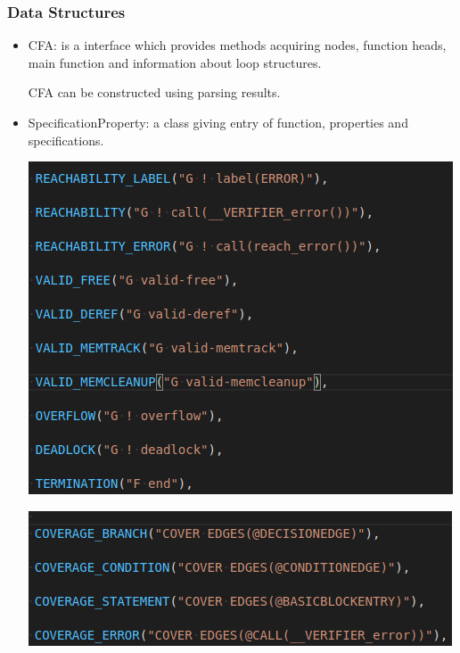 \documentclass[11pt]{beamer}
\begin{document}
\begin{frame}\frametitle{Data Structures}
\begin{itemize}
\item CFA: is a interface which provides methods acquiring nodes, function heads, main function and information about loop structures.

CFA can be constructed using parsing results.


\item SpecificationProperty: a class giving entry of function, properties and specifications.
\begin{multicols}{2}
\begin{center}
\includegraphics[scale=0.35]{commonP.png}

\includegraphics[scale=0.35]{commonC.png}
\end{center}
\end{multicols}

\end{itemize}

\end{frame}
\end{document}
